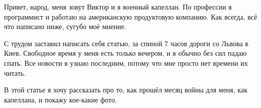  
 
 
 
 

Привет, народ, меня зовут Виктор и я военный капеллан. По профессии я
программист и работаю на американскую продуктовую компанию. Как всегда, всё что
написано ниже, сугубо моё мнение.

С трудом заставил написать себя статью, за спиной 7 часов дороги со Львова в
Киев. Свободное время у меня есть только вечером, и я обычно без сил падаю
спать. Все новости я узнаю последним, потому что мне просто нет времени их
читать.

В этой статье я хочу рассказать про то, как прошёл месяц войны для меня, как
капеллана, и покажу кое-какие фото.
